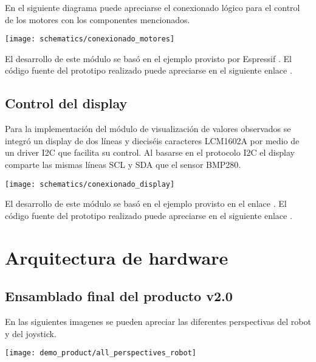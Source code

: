 En el siguiente diagrama puede apreciarse el conexionado lógico para el control de los motores con los componentes mencionados.

\begin{center}
\texttt{[image: schematics/conexionado\_motores]}
  \label{fig:conexionado_motores}
\end{center}

El desarrollo de este módulo se basó en el ejemplo provisto por Espressif \cite{ESP32_MCPWM_example}. El código fuente del prototipo realizado puede apreciarse en el siguiente enlace \cite{ESP32_POC_motor_MCPWM}.



\subsection{Control del display}

Para la implementación del módulo de visualización de valores observados se integró un display de dos líneas y dieciséis caracteres LCM1602A por medio de un driver I2C que facilita su control. Al basarse en el protocolo I2C el display comparte las mismas líneas SCL y SDA que el sensor BMP280.

\begin{center}
\texttt{[image: schematics/conexionado\_display]}
  \label{fig:conexionado_display}

\end{center}


El desarrollo de este módulo se basó en el ejemplo provisto en el enlace \cite{ESP32_Display_Example}. El código fuente del prototipo realizado puede apreciarse en el siguiente enlace \cite{ESP32_POC_display}.


\section{Arquitectura de hardware}


\subsection{Ensamblado final del producto v2.0}

En las siguientes imagenes se pueden apreciar las diferentes perspectivas del robot y del joystick.

\begin{center}
\texttt{[image: demo\_product/all\_perspectives\_robot]}
  \label{fig:conexionado_fisico}
\end{center}


